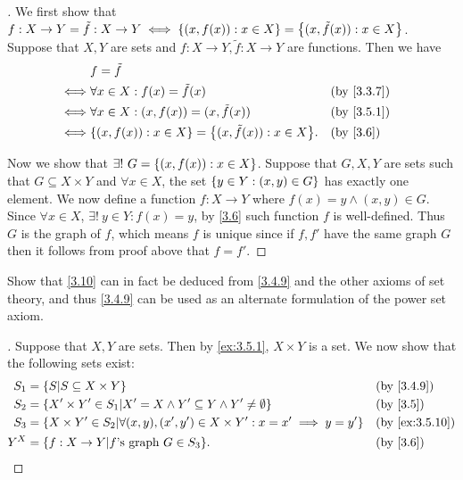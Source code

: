 \begin{proof}[]
	We first show that \(f : X \to Y = \tilde{f} : X \to Y \iff \left\lbrace(x, f(x)) : x \in X\right\rbrace = \left\lbrace(x, \tilde{f}(x)) : x \in X\right\rbrace\).
	Suppose that \(X, Y\) are sets and \(f : X \to Y, \tilde{f} : X \to Y\) are functions.
	Then we have
	\begin{align*}
		     & f = \tilde{f}                                                                  \\
		\iff & \forall x \in X : f(x) = \tilde{f}(x)                          &  & \by{3.3.7} \\
		\iff & \forall x \in X : (x, f(x)) = (x, \tilde{f}(x))                &  & \by{3.5.1} \\
		\iff & \set{(x, f(x)) : x \in X} = \set{(x, \tilde{f}(x)) : x \in X}. &  & \by{3.6}
	\end{align*}

	Now we show that \(\exists!\ G = \left\lbrace(x, f(x)) : x \in X\right\rbrace\).
	Suppose that \(G, X, Y\) are sets such that \(G \subseteq X \times Y\) and \(\forall x \in X\), the set \(\left\lbrace y \in Y : (x, y) \in G\right\rbrace\) has exactly one element.
	We now define a function \(f : X \to Y\) where \(f(x) = y \land (x, y) \in G\).
	Since \(\forall x \in X\), \(\exists!\ y \in Y : f(x) = y\), by \cref{3.6} such function \(f\) is well-defined.
	Thus \(G\) is the graph of \(f\), which means \(f\) is unique since if \(f, f'\) have the same graph \(G\) then it follows from proof above that \(f = f'\).
\end{proof}

\begin{ex}\label{ex:3.5.11}
	Show that \cref{3.10} can in fact be deduced from \cref{3.4.9} and the other axioms of set theory, and thus \cref{3.4.9} can be used as an alternate formulation of the power set axiom.
\end{ex}

\begin{proof}[]
	Suppose that \(X, Y\) are sets.
	Then by \cref{ex:3.5.1}, \(X \times Y\) is a set.
	We now show that the following sets exist:
	\begin{align*}
		S_1 & = \set{S | S \subseteq X \times Y}                                                              &  & \by{3.4.9}     \\
		S_2 & = \set{X' \times Y' \in S_1 | X' = X \land Y' \subseteq Y \land Y' \neq \emptyset}              &  & \by{3.5}       \\
		S_3 & = \set{X \times Y' \in S_2 | \forall (x, y), (x', y') \in X \times Y' : x = x' \implies y = y'} &  & \by{ex:3.5.10} \\
		Y^X & = \set{f : X \to Y | f \text{'s graph } G \in S_3}.                                             &  & \by{3.6}
	\end{align*}
\end{proof}

